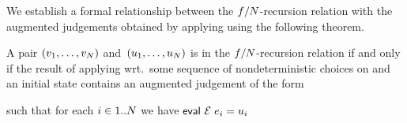 


We establish a formal relationship between the
$f/N$-recursion relation with the augmented
judgements obtained by applying \monitor using the following theorem.
%
\begin{theorem}
\label{thm-monitor}
%
A pair $(v_1, \dots, v_{N})$ and~$(u_1, \dots, u_{N})$ is
in the $f/N$-recursion relation if and only if the
result of applying \monitor wrt.\ some sequence of nondeterministic
choices on \evjvar and an initial state contains an augmented
judgement of the form
%
\begin{center}
\end{center}
%
such that for each $i \in 1..N$ we have $\tsf{eval}\ \ectx\
\expr[i] = u_i$
%
\end{theorem}
%

